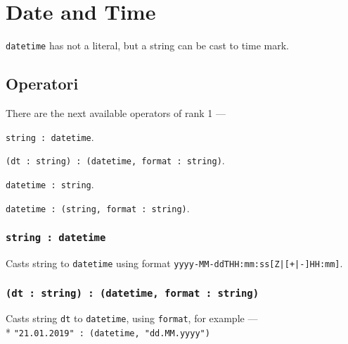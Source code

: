 \section{Date and Time}

\texttt{datetime} has not a literal, but a string can be cast to time mark.

\subsection{Operatori}

There are the next available operators of rank 1 —
\begin{icItems}
	\item \texttt{string : datetime}.
	\item \texttt{(dt : string) : (datetime, format : string)}.
	\item \texttt{datetime : string}.
	\item \texttt{datetime : (string, format : string)}.
\end{icItems}

\subsubsection{\texttt{string : datetime}}

Casts string to \texttt{datetime} using format \texttt{yyyy-MM-ddTHH:mm:ss[Z|[+|-]HH:mm]}.

\subsubsection{\texttt{(dt : string) : (datetime, format : string)}}

Casts string \texttt{dt} to \texttt{datetime}, using \texttt{format}, for example —\\* \texttt{"21.01.2019" : (datetime, "dd.MM.yyyy")}

